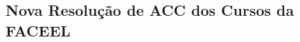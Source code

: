 
\begin{anexosenv}
\partanexos

\chapter{Nova Resolução de ACC dos Cursos da FACEEL}     %
\label{anexo:novaResolucaoDeACC}









\end{anexosenv}
